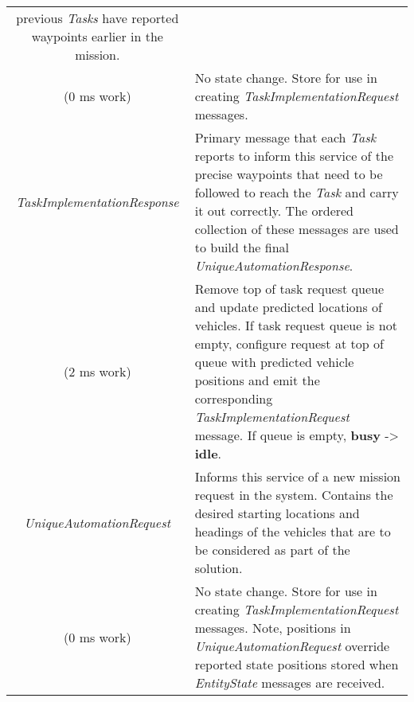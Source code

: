 \begin{longtable}[]{@{}cl@{}}
\begin{minipage}[t]{0.55\columnwidth}
previous \emph{Tasks} have reported waypoints earlier in the
mission.\strut
\end{minipage}\tabularnewline
\begin{minipage}[t]{0.40\columnwidth}\centering\strut
(0 ms work)\strut
\end{minipage} & \begin{minipage}[t]{0.55\columnwidth}\raggedright\strut
No state change. Store for use in creating
\emph{TaskImplementationRequest} messages.\strut
\end{minipage}\tabularnewline
\begin{minipage}[t]{0.40\columnwidth}\centering\strut
\emph{TaskImplementationResponse}\strut
\end{minipage} & \begin{minipage}[t]{0.55\columnwidth}\raggedright\strut
Primary message that each \emph{Task} reports to inform this service of
the precise waypoints that need to be followed to reach the \emph{Task}
and carry it out correctly. The ordered collection of these messages are
used to build the final \emph{UniqueAutomationResponse}.\strut
\end{minipage}\tabularnewline
\begin{minipage}[t]{0.40\columnwidth}\centering\strut
(2 ms work)\strut
\end{minipage} & \begin{minipage}[t]{0.55\columnwidth}\raggedright\strut
Remove top of task request queue and update predicted locations of
vehicles. If task request queue is not empty, configure request at top
of queue with predicted vehicle positions and emit the corresponding
\emph{TaskImplementationRequest} message. If queue is empty,
\textbf{busy} -\textgreater{} \textbf{idle}.\strut
\end{minipage}\tabularnewline
\begin{minipage}[t]{0.40\columnwidth}\centering\strut
\emph{UniqueAutomationRequest}\strut
\end{minipage} & \begin{minipage}[t]{0.55\columnwidth}\raggedright\strut
Informs this service of a new mission request in the system. Contains
the desired starting locations and headings of the vehicles that are to
be considered as part of the solution.\strut
\end{minipage}\tabularnewline
\begin{minipage}[t]{0.40\columnwidth}\centering\strut
(0 ms work)\strut
\end{minipage} & \begin{minipage}[t]{0.55\columnwidth}\raggedright\strut
No state change. Store for use in creating
\emph{TaskImplementationRequest} messages. Note, positions in
\emph{UniqueAutomationRequest} override reported state positions stored
when \emph{EntityState} messages are received.\strut
\end{minipage}\tabularnewline
\bottomrule
\end{longtable}

